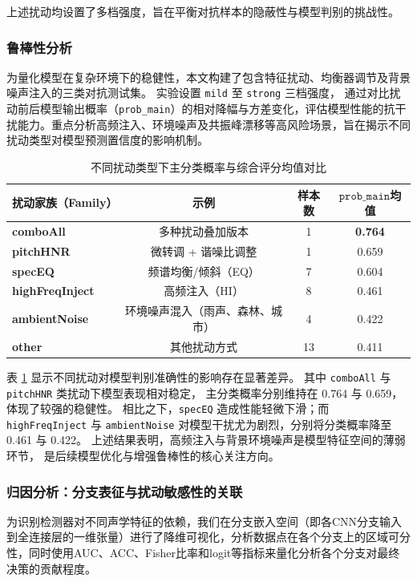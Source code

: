 \documentclass[a4paper,12pt]{article}
\begin{document}
上述扰动均设置了多档强度，旨在平衡对抗样本的隐蔽性与模型判别的挑战性。


\subsubsection{鲁棒性分析}
为量化模型在复杂环境下的稳健性，本文构建了包含特征扰动、均衡器调节及背景噪声注入的三类对抗测试集。
实验设置 \texttt{mild} 至 \texttt{strong} 三档强度，
通过对比扰动前后模型输出概率（\texttt{prob\_main}）的相对降幅与方差变化，评估模型性能的抗干扰能力。重点分析高频注入、环境噪声及共振峰漂移等高风险场景，旨在揭示不同扰动类型对模型预测置信度的影响机制。

\begin{table}[H]
\centering
\caption{不同扰动类型下主分类概率与综合评分均值对比}
\label{tab:family-stats}
\begin{tabular}{lccc}
\toprule
扰动家族（Family） & 示例 & 样本数 & $\texttt{prob\_main}$均值 \\
\midrule
\textbf{comboAll}       & 多种扰动叠加版本                 & 1  & \textbf{0.764}\\
\textbf{pitchHNR}       & 微转调 + 谐噪比调整              & 1  & 0.659\\ 
\textbf{specEQ}         & 频谱均衡/倾斜（EQ）              & 7  & 0.604\\ 
\textbf{highFreqInject} & 高频注入（HI）                   & 8  & 0.461\\ 
\textbf{ambientNoise}   & 环境噪声混入（雨声、森林、城市） & 4  & 0.422\\ 
\textbf{other}          & 其他扰动方式                     & 13 & 0.411\\ 
\bottomrule
\end{tabular}
\end{table}

表 \ref{tab:family-stats} 显示不同扰动对模型判别准确性的影响存在显著差异。
其中 \texttt{comboAll} 与 \texttt{pitchHNR} 类扰动下模型表现相对稳定，
主分类概率分别维持在 0.764 与 0.659，体现了较强的稳健性。
相比之下，\texttt{specEQ} 造成性能轻微下滑；而 \texttt{highFreqInject} 与 
\texttt{ambientNoise} 对模型干扰尤为剧烈，分别将分类概率降至 0.461 与 0.422。
上述结果表明，高频注入与背景环境噪声是模型特征空间的薄弱环节，
是后续模型优化与增强鲁棒性的核心关注方向。





\subsubsection{归因分析：分支表征与扰动敏感性的关联}
为识别检测器对不同声学特征的依赖，我们在分支嵌入空间（即各CNN分支输入到全连接层的一维张量）进行了降维可视化，分析数据点在各个分支上的区域可分性，同时使用AUC、ACC、Fisher比率和logit等指标来量化分析各个分支对最终决策的贡献程度。
\end{document}
